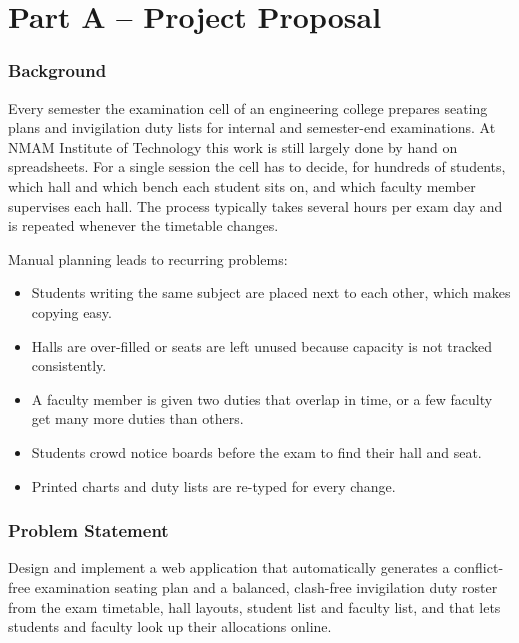 \documentclass[11pt,a4paper]{article}
\begin{document}

\newpage
\tableofcontents
\newpage
{}

\part*{Part A -- Project Proposal}

\section{Background}
Every semester the examination cell of an engineering college prepares seating plans and invigilation duty lists for internal and semester-end examinations. At NMAM Institute of Technology this work is still largely done by hand on spreadsheets. For a single session the cell has to decide, for hundreds of students, which hall and which bench each student sits on, and which faculty member supervises each hall. The process typically takes several hours per exam day and is repeated whenever the timetable changes.

Manual planning leads to recurring problems:
\begin{itemize}
  \item Students writing the same subject are placed next to each other, which makes copying easy.
  \item Halls are over-filled or seats are left unused because capacity is not tracked consistently.
  \item A faculty member is given two duties that overlap in time, or a few faculty get many more duties than others.
  \item Students crowd notice boards before the exam to find their hall and seat.
  \item Printed charts and duty lists are re-typed for every change.
\end{itemize}

\section{Problem Statement}
\begin{notebox}
Design and implement a web application that automatically generates a conflict-free examination seating plan and a balanced, clash-free invigilation duty roster from the exam timetable, hall layouts, student list and faculty list, and that lets students and faculty look up their allocations online.
\end{notebox}
\end{document}
